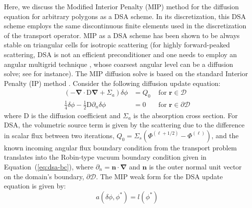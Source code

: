 \documentclass[preprint,10pt]{elsarticle}
\newcommand\bn{\boldsymbol{\nabla}}
\newcommand\bo{\boldsymbol{\Omega}}
\newcommand\br{\mathbf{r}}
\newcommand\bs{\boldsymbol}
\newcommand\mc{\mathcal}
\renewcommand{\(}{\left(}
\renewcommand{\)}{\right)}
\renewcommand{\[}{\left[}
\renewcommand{\]}{\right]}
\begin{document}
Here, we discuss the Modified Interior Penalty (MIP) method for the diffusion equation for arbitrary polygons
as a DSA scheme. 
In its discretization, this DSA scheme employs the same discontinuous finite elements used in the 
discretization of the transport operator. 
MIP as a DSA scheme has been shown to be always stable on triangular cells for isotropic scattering \cite{mip}
(for highly forward-peaked scattering, DSA is not an efficient preconditioner and one needs to employ
an angular multigrid technique \cite{angular_multigrid_1d}, whose coarsest angular level can be a diffusion solve;
see \cite{angular_multigrid_bruno} for instance). 
The MIP diffusion solve is based on the standard Interior Penalty (IP) method
\cite{Kanschat2007}.
Consider the following diffusion update equation:
\begin{align}
  \label{eq:dsa}
  \left(-\bn \cdot \mathrm{D} \bn  + \Sigma_a \right) \delta \phi &= Q_0 &\textrm{ for }\br \in
  \mc{D}\\
  \label{eq:dsa-bc}
  \frac{1}{4}\delta \phi - \frac{1}{2} \mathrm{D} \partial_n \delta \phi & = 0 &\textrm{ for }
  \br \in \partial \mc{D} %
\end{align}
where $\mathrm{D}$ is the diffusion coefficient and $\Sigma_a$ is the absorption cross section. 
%
%
For DSA, the volumetric source term is given by the scattering due to the difference in scalar flux
between two iterations, $Q_0=\Sigma_s\(\Phi^{(\ell+1/2)}-\Phi^{(\ell)}\)$, 
%
%
and the known incoming angular flux boundary condition from the transport problem translates into the Robin-type
vacuum boundary condition given in Equation~\textup {(\ref {eq:dsa-bc})}, where $\partial_{n} = \bs{n}\cdot \bn$
and $\bs{n}$ is the outer normal unit vector on the domain's boundary, $\partial \mc{D}$. 
%
%
The MIP weak form for the DSA update equation is given by:
\begin{equation}
a(\delta \phi,\phi^*) = l(\phi^*)
\label{mip}
\end{equation}
\end{document}
